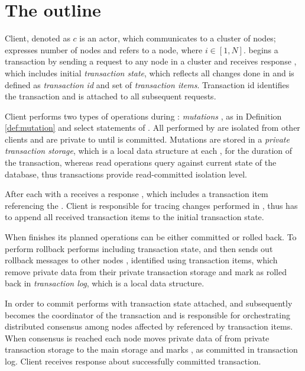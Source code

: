 
\section{The outline}
Client, denoted as $c$ is an actor, which communicates to a cluster of nodes; \nodes expresses number of nodes and  refers to a node, where $i \in [1,N]$. \client begins a transaction \transaction by sending a request to any node in a cluster  and receives response , which includes 
initial \emph{transaction state}, which reflects all changes done in \transaction and is defined as \emph{transaction id} and set of \emph{transaction items}. Transaction id identifies the transaction and is attached to all subsequent requests. 


Client \client performs two types of operations during \transaction: \emph{mutations} \mutations, as in Definition \ref{def:mutation} and select statements of \kv. All   performed by \client are isolated from other clients and are private to \transaction until \transaction is committed. Mutations are stored in a \emph{private transaction storage}, which is a local data structure at each , for the duration of the transaction, whereas read operations query against current state of the database, thus transactions provide read-committed isolation level.

After each  with a  \client receives a response , which includes a transaction item referencing the . Client is responsible for tracing changes performed in \transaction, thus \client has to append all received transaction items to the initial transaction state.

When \client finishes its planned operations \transaction can be either committed or rolled back. To perform rollback \client performs  including transaction state, and then  sends out rollback messages to other nodes , identified using transaction items, which remove private data from their private transaction storage and mark \transaction as rolled back in \emph{transaction log}, which is a local data structure.

In order to commit \transaction \client performs  with transaction state attached, and subsequently  becomes the coordinator of the transaction and is responsible for orchestrating distributed consensus among nodes affected by \transaction referenced by transaction items. When consensus is reached each node moves private data of \transaction from private transaction storage to the main storage and marks \transaction, as committed in transaction log. Client receives response  about successfully committed transaction.


